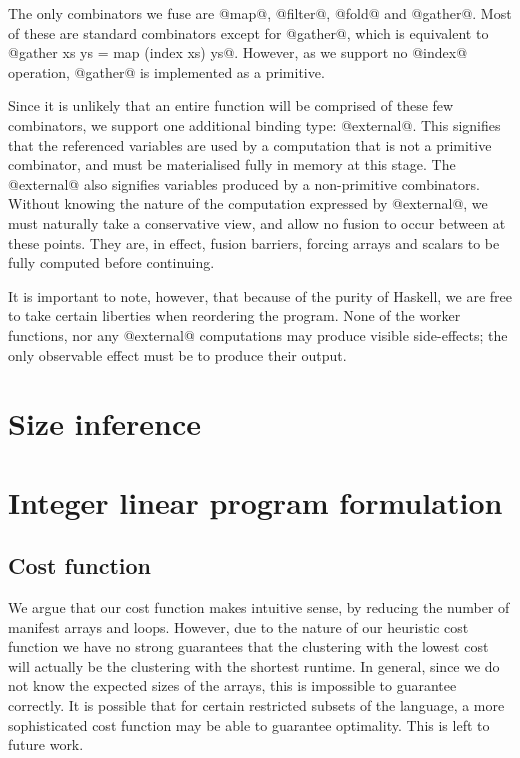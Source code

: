 \documentclass[preprint]{sigplanconf}
\begin{document}
The only combinators we fuse are @map@, @filter@, @fold@ and @gather@.
Most of these are standard combinators except for @gather@, which is equivalent to @gather xs ys = map (index xs) ys@.
However, as we support no @index@ operation, @gather@ is implemented as a primitive.

Since it is unlikely that an entire function will be comprised of these few combinators, we support one additional binding type: @external@. This signifies that the referenced variables are used by a computation that is not a primitive combinator, and must be materialised fully in memory at this stage.
The @external@ also signifies variables produced by a non-primitive combinators.
Without knowing the nature of the computation expressed by @external@, we must naturally take a conservative view, and allow no fusion to occur between at these points. They are, in effect, fusion barriers, forcing arrays and scalars to be fully computed before continuing.

It is important to note, however, that because of the purity of Haskell, we are free to take certain liberties when reordering the program.
None of the worker functions, nor any @external@ computations may produce visible side-effects; the only observable effect must be to produce their output.


\section{Size inference}

\section{Integer linear program formulation}

\subsection{Cost function}
We argue that our cost function makes intuitive sense, by reducing the number of manifest arrays and loops.
However, due to the nature of our heuristic cost function we have no strong guarantees that the clustering with the lowest cost will actually be the clustering with the shortest runtime.
In general, since we do not know the expected sizes of the arrays, this is impossible to guarantee correctly.
It is possible that for certain restricted subsets of the language, a more sophisticated cost function may be able to guarantee optimality.
This is left to future work.
\end{document}
